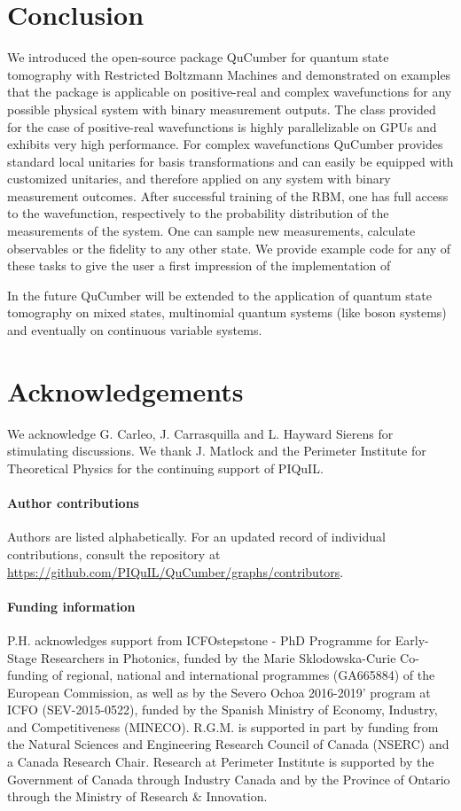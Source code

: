 \documentclass[submission, Phys]{SciPost}
\begin{document}
\section{Conclusion}

We introduced the open-source package QuCumber for quantum state tomography with Restricted Boltzmann Machines and demonstrated on examples that
the package is applicable on positive-real and complex wavefunctions for any possible physical system with binary measurement outputs.
The class provided for the case of positive-real wavefunctions is highly parallelizable on GPUs and exhibits very high performance.
For complex wavefunctions QuCumber provides standard local unitaries for basis transformations
and can easily be equipped with customized unitaries, and therefore applied on any system with binary measurement outcomes.
After successful training of the RBM, one has full access to the wavefunction, respectively to the probability distribution of the measurements of the system.
One can sample new measurements, calculate observables or the fidelity to any other state.
We provide example code for any of these tasks to give the user a first impression of the implementation of

In the future QuCumber will be extended to the application of quantum state tomography on mixed states, multinomial quantum systems (like boson systems) and eventually on continuous variable systems.

\section*{Acknowledgements}
We acknowledge G. Carleo, J. Carrasquilla and L. Hayward Sierens for stimulating discussions.  
We thank J. Matlock and the Perimeter Institute for Theoretical Physics for the continuing support of PIQuIL.

\paragraph{Author contributions}
Authors are listed alphabetically. For an updated record of individual contributions, consult the repository at \url{https://github.com/PIQuIL/QuCumber/graphs/contributors}.

\paragraph{Funding information}
P.H. acknowledges support from ICFOstepstone - PhD Programme for Early-Stage Researchers in Photonics, funded by the Marie Sklodowska-Curie Co-funding of regional, national and international programmes (GA665884) of the European Commission, as well as by the Severo Ochoa 2016-2019' program at ICFO (SEV-2015-0522), funded by the Spanish Ministry of Economy, Industry, and Competitiveness (MINECO).
R.G.M. is supported in part by funding from the Natural Sciences and Engineering Research Council of Canada (NSERC) and a Canada Research Chair.
Research at Perimeter Institute is supported by the Government of Canada through Industry Canada and by the Province of Ontario through the Ministry of Research \& Innovation.
\end{document}
